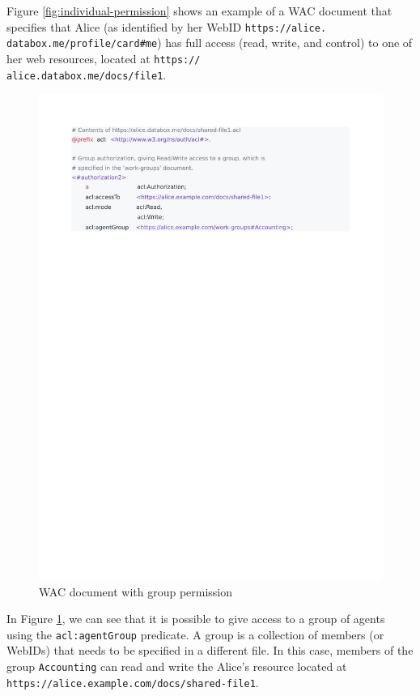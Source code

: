 \documentclass[sigconf]{acmart}
\def\code#1{\texttt{#1}}
\begin{document}
Figure \ref{fig:individual-permission} shows an example of a WAC document that specifies that Alice (as identified by her WebID \code{https://alice.\\databox.me/profile/card\#me}) has full access (read, write, and control) to one of her web resources, located at \code{https://\\alice.databox.me/docs/file1}.


\begin{figure}
  \includegraphics[trim=2cm 21.2cm 4.7cm 2cm, clip, scale=0.57]{pdf/shared-file1}
  \caption{WAC document with group permission}
  \label{fig:group-permission}
\end{figure}

In Figure \ref{fig:group-permission}, we can see that it is possible to give access to a group of agents using the \code{acl:agentGroup} predicate. A group is a collection of members (or WebIDs) that needs to be specified in a different file. In this case, members of the group \code{Accounting} can read and write the Alice's resource located at \code{https://alice.example.com/docs/shared-file1}.
\end{document}
